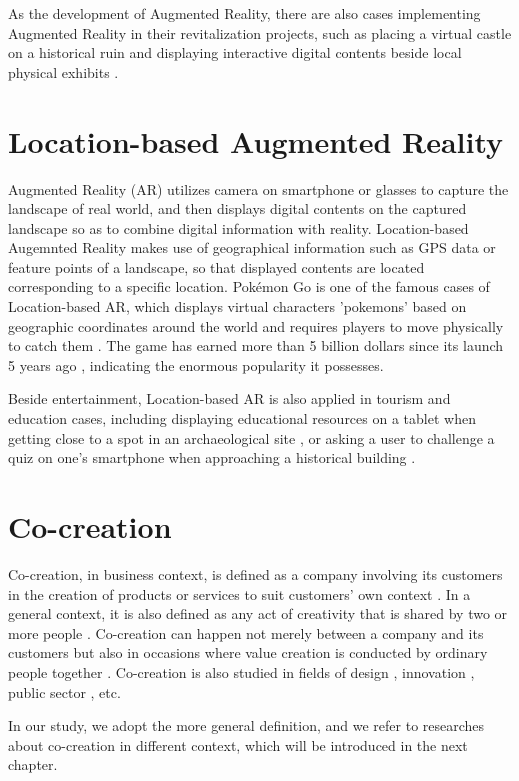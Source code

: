 As the development of Augmented Reality, there are also cases implementing Augmented Reality in their revitalization projects,
such as placing a virtual castle on a historical ruin \cite{井上道哉_長澤可也_2021} and displaying interactive digital contents beside local physical exhibits \cite{センチメンタル価値再生_2016}\cite{armarker_and_behavior_log_2011}.

\section{Location-based Augmented Reality}
Augmented Reality (AR) utilizes camera on smartphone or glasses to capture the landscape of real world,
and then displays digital contents on the captured landscape so as to combine digital information with reality.
Location-based Augemnted Reality makes use of geographical information such as GPS data or feature points of a landscape,
so that displayed contents are located corresponding to a specific location.
Pokémon Go is one of the famous cases of Location-based AR, which displays virtual characters 'pokemons' based on geographic coordinates around the world and requires players to move physically to catch them \cite{pokemongo_homepage}.
The game has earned more than 5 billion dollars since its launch 5 years ago \cite{strategist_2021}, indicating the enormous popularity it possesses.

Beside entertainment, Location-based AR is also applied in tourism and education cases,
including displaying educational resources on a tablet when getting close to a spot in an archaeological site \cite{law_2018},
or asking a user to challenge a quiz on one's smartphone when approaching a historical building \cite{hwang_chang_chen_chen_2017}.

\section{Co-creation}
Co-creation, in business context, is defined as a company involving its customers in the creation of products or services to suit customers' own context \cite{cocreation_definition}.
In a general context, it is also defined as any act of creativity that is shared by two or more people \cite{cocreation_definition_general}.
Co-creation can happen not merely between a company and its customers but also in occasions where value creation is conducted by ordinary people together \cite{cocreation_general_case}.
Co-creation is also studied in fields of design \cite{cocreation_definition_general}, innovation \cite{lee_olson_trimi_2012}, public sector \cite{osborne_radnor_strokosch_2016}, etc.

In our study, we adopt the more general definition, and we refer to researches about co-creation in different context,
which will be introduced in the next chapter.